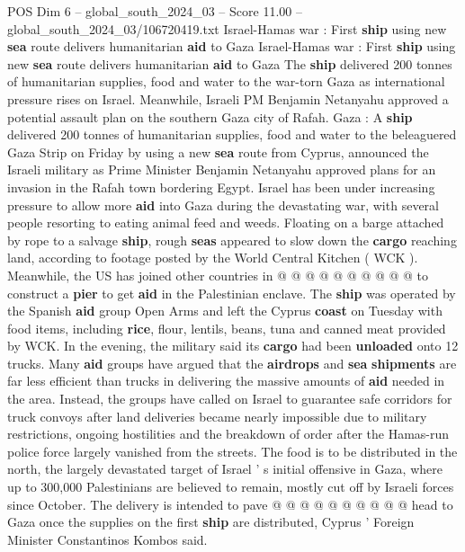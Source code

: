 \begin{textsample}{POS Dim 6 – global\_south\_2024\_03 – Score 11.00 – global\_south\_2024\_03/106720419.txt}  \label{ex:f6_pos_037}
Israel-Hamas war : First \textbf{ship} using new \textbf{sea} route delivers humanitarian \textbf{aid} to Gaza Israel-Hamas war : First \textbf{ship} using new \textbf{sea} route delivers humanitarian \textbf{aid} to Gaza The \textbf{ship} delivered 200 tonnes of humanitarian supplies, food and water to the war-torn Gaza as international pressure rises on Israel.
Meanwhile, Israeli PM Benjamin Netanyahu approved a potential assault plan on the southern Gaza city of Rafah.
Gaza : A \textbf{ship} delivered 200 tonnes of humanitarian supplies, food and water to the beleaguered Gaza Strip on Friday by using a new \textbf{sea} route from Cyprus, announced the Israeli military as Prime Minister Benjamin Netanyahu approved plans for an invasion in the Rafah town bordering Egypt.
Israel has been under increasing pressure to allow more \textbf{aid} into Gaza during the devastating war, with several people resorting to eating animal feed and weeds.
Floating on a barge attached by rope to a salvage \textbf{ship}, rough \textbf{seas} appeared to slow down the \textbf{cargo} reaching land, according to footage posted by the World Central Kitchen ( WCK ).
Meanwhile, the US has joined other countries in @ @ @ @ @ @ @ @ @ @ to construct a \textbf{pier} to get \textbf{aid} in the Palestinian enclave.
The \textbf{ship} was operated by the Spanish \textbf{aid} group Open Arms and left the Cyprus \textbf{coast} on Tuesday with food items, including \textbf{rice}, flour, lentils, beans, tuna and canned meat provided by WCK.
In the evening, the military said its \textbf{cargo} had been \textbf{unloaded} onto 12 trucks.
Many \textbf{aid} groups have argued that the \textbf{airdrops} and \textbf{sea} \textbf{shipments} are far less efficient than trucks in delivering the massive amounts of \textbf{aid} needed in the area.
Instead, the groups have called on Israel to guarantee safe corridors for truck convoys after land deliveries became nearly impossible due to military restrictions, ongoing hostilities and the breakdown of order after the Hamas-run police force largely vanished from the streets.
The food is to be distributed in the north, the largely devastated target of Israel ' s initial offensive in Gaza, where up to 300,000 Palestinians are believed to remain, mostly cut off by Israeli forces since October.
The delivery is intended to pave @ @ @ @ @ @ @ @ @ @ head to Gaza once the supplies on the first \textbf{ship} are distributed, Cyprus ' Foreign Minister Constantinos Kombos said.

\end{textsample}
